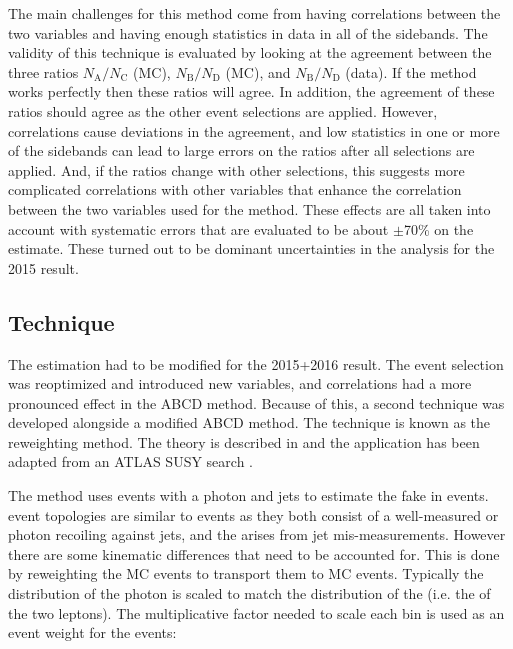The main challenges for this method come from having correlations between the two variables and having enough statistics in data in all of the sidebands. The validity of this technique is evaluated by looking at the agreement between the three ratios $N_\text{A}/N_\text{C}$ (MC), $N_\text{B}/N_\text{D}$ (MC), and $N_\text{B}/N_\text{D}$ (data). If the method works perfectly then these ratios will agree. In addition, the agreement of these ratios should agree as the other event selections are applied. However, correlations cause deviations in the agreement, and low statistics in one or more of the sidebands can lead to large errors on the ratios after all selections are applied. And, if the ratios change with other selections, this suggests more complicated correlations with other variables that enhance the correlation between the two variables used for the method. These effects are all taken into account with systematic errors that are evaluated to be about $\pm$70\% on the \Zjets estimate. These turned out to be dominant uncertainties in the analysis for the 2015 result.

\subsection{\gjets Technique}
\label{sec:gjets}

The \Zjets estimation had to be modified for the 2015+2016 result. The event selection was reoptimized and introduced new variables, and correlations had a more pronounced effect in the ABCD method. Because of this, a second technique was developed alongside a modified ABCD method. The technique is known as the \gjets reweighting method. The theory is described in \cite{Ask:2011xf} and the application has been adapted from an ATLAS SUSY search \cite{Galster:2151990}.

The \gjets method uses events with a photon and jets to estimate the fake \etmiss in \Zjets events. \gjets event topologies are similar to \Zjets events as they both consist of a well-measured \Z or photon recoiling against jets, and the \etmiss arises from jet mis-measurements. However there are some kinematic differences that need to be accounted for. This is done by reweighting the \gjets MC events to transport them to \Zjets MC events. Typically the \pt distribution of the photon is scaled to match the \pt distribution of the \Z (i.e. the \pt of the two leptons). The multiplicative factor needed to scale each \pt bin is used as an event weight for the \gjets events: 

